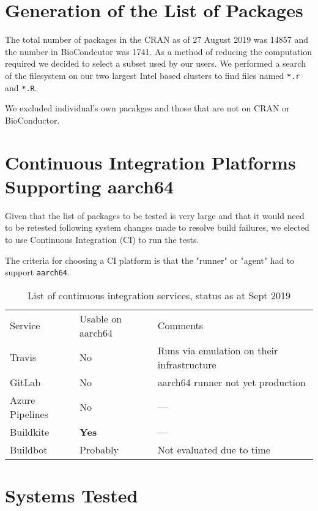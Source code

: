 \section{Generation of the List of Packages}

The total number of packages in the \textsc{CRAN} as of 27 August 2019 was
14857 and the number in BioCondcutor was 1741. As a method of reducing the
computation required we decided to select a subset used by our users. We
performed a search of the filesystem on our two largest Intel based clusters
to find files named \texttt{*.r} and \texttt{*.R}.

We excluded individual's own pacakges and those that are not on
\textsc{CRAN} or BioConductor.

\section{Continuous Integration Platforms Supporting aarch64}

Given that the list of packages to be tested is very large and that it would need to be retested following system changes made to resolve build failures, we elected to use Continuous Integration (\textsc{CI}) to run the tests.

The criteria for choosing a \textsc{CI} platform is that the "runner" or "agent" had to support \texttt{aarch64}.

\begin{table}[htbp]
\centering
\begin{tabular}{lll}
\cline{1-3}
Service & Usable on aarch64 & Comments\\ \cline{1-3}
Travis & No & Runs via emulation on their infrastructure\\
GitLab & No & aarch64 runner not yet production\\
Azure Pipelines & No & ---\\
Buildkite & \textbf{Yes} & --- \\
Buildbot & Probably & Not evaluated due to time \\ \cline{1-3}
\end{tabular}
\caption{List of continuous integration services, status as at Sept 2019}
\label{tab:ci-services}
\end{table}

\section{Systems Tested}

